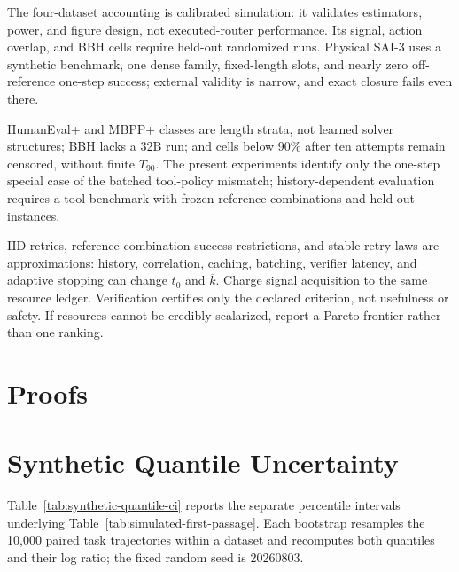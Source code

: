 \documentclass{article}
\theoremstyle{definition}
\theoremstyle{plain}
\theoremstyle{remark}
\begin{document}
The four-dataset accounting is calibrated simulation: it validates estimators,
power, and figure design, not executed-router performance.  Its signal, action
overlap, and BBH cells require held-out randomized runs.  Physical SAI-3 uses a
synthetic benchmark, one dense family, fixed-length slots, and nearly zero
off-reference one-step success; external validity is narrow, and exact closure fails even
there.

HumanEval+ and MBPP+ classes are length strata, not learned solver structures;
BBH lacks a 32B run; and cells below 90\% after ten attempts remain censored,
without finite \(T_{90}\).  The present experiments identify only the one-step
special case of the batched tool-policy mismatch; history-dependent
evaluation requires a tool benchmark with frozen reference combinations and
held-out instances.

IID retries, reference-combination success restrictions, and stable retry laws are
approximations:
history, correlation, caching, batching, verifier latency, and adaptive stopping
can change \(t_0\) and \(\overline k\).  Charge signal acquisition
to the same resource ledger.  Verification certifies only the declared criterion, not
usefulness or safety.  If resources cannot be credibly scalarized, report a
Pareto frontier rather than one ranking.




\clearpage
\appendix

\section{Proofs}
\label{app:proofs}



\section{Synthetic Quantile Uncertainty}

Table~\ref{tab:synthetic-quantile-ci} reports the separate percentile intervals
underlying Table~\ref{tab:simulated-first-passage}.  Each bootstrap resamples
the 10,000 paired task trajectories within a dataset and recomputes both
quantiles and their log ratio; the fixed random seed is 20260803.
\end{document}
